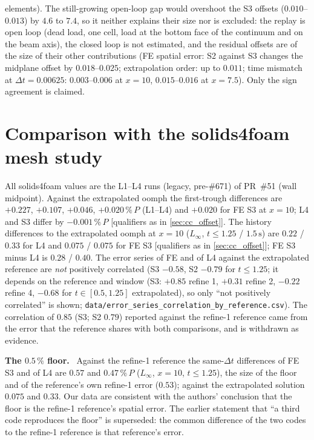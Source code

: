 \documentclass[sn-mathphys,Numbered]{sn-jnl}
\newcommand{\uref}{{\small[qualifiers as in \ref{sec:cc_offset}]}}
\newcommand{\legbc}{\textcolor{red!70!black}{(legacy, pre-\#671)}}
\renewcommand{\paragraph}[1]{\par\vspace{0.15\baselineskip}\noindent\textbf{#1}\ }
\begin{document}
elements). The still-growing open-loop gap would overshoot the S3 offsets ($0.010$--$0.013$) by $4.6$ to $7.4$, so it neither explains their size nor is excluded: the replay is open loop (dead load, one cell, load at the bottom face of the continuum and on the beam axis), the closed loop is not estimated, and the residual offsets are of the size of their other contributions (FE spatial error: S2 against S3 changes the midplane offset by $0.018$--$0.025$; extrapolation order: up to $0.011$; time mismatch at $\Delta t=0.00625$: $0.003$--$0.006$ at $x=10$, $0.015$--$0.016$ at $x=7.5$). Only the sign agreement is claimed.

\section{Comparison with the solids4foam mesh study}\label{sec:cc_s4f}
All solids4foam values are the L1--L4 runs \legbc{} of PR~\#51 (wall midpoint). Against the extrapolated oomph the first-trough differences are $+0.227$, $+0.107$, $+0.046$, $+0.020\,\%\,P$ (L1--L4) and $+0.020$ for FE S3 at $x=10$; L4 and S3 differ by $-0.001\,\%\,P$ \uref. The history differences to the extrapolated oomph at $x=10$ ($L_\infty$, $t\le1.25$ / $1.5\,\mathrm s$) are $0.22$ / $0.33$ for L4 and $0.075$ / $0.075$ for FE S3 \uref; FE S3 minus L4 is $0.28$ / $0.40$. The error series of FE and of L4 against the extrapolated reference are \emph{not} positively correlated (S3 $-0.58$, S2 $-0.79$ for $t\le1.25$; it depends on the reference and window (S3: $+0.85$ refine 1, $+0.31$ refine 2, $-0.22$ refine 4, $-0.68$ for $t\in[0.5,1.25]$ extrapolated), so only ``not positively correlated'' is shown; \texttt{data/error\_series\_correlation\_by\_reference.csv}). The correlation of $0.85$ (S3; S2 $0.79$) reported against the refine-1 reference came from the error that the reference shares with both comparisons, and is withdrawn as evidence.
\paragraph{The $0.5\,\%$ floor.}
Against the refine-1 reference the same-$\Delta t$ differences of FE S3 and of L4 are $0.57$ and $0.47\,\%\,P$ ($L_\infty$, $x=10$, $t\le1.25$), the size of the floor and of the reference's own refine-1 error ($0.53$); against the extrapolated solution $0.075$ and $0.33$. Our data are consistent with the authors' conclusion that the floor is the refine-1 reference's spatial error. The earlier statement that ``a third code reproduces the floor'' is superseded: the common difference of the two codes to the refine-1 reference is that reference's error.
\end{document}
